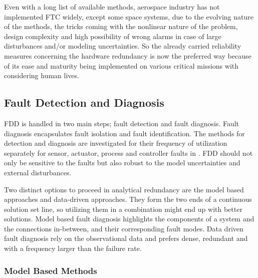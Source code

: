 Even with a long list of available methods, aerospace industry has not implemented 
FTC widely, except some space systems, due to the evolving nature of the methods, 
the tricks coming with the nonlinear nature of the problem, design complexity and high 
possibility of wrong alarms in case of large disturbances and/or modeling uncertainties. 
So the already carried reliability measures concerning the hardware redundancy is 
now the preferred way because of its ease and maturity being implemented on various 
critical missions with considering human lives.

\subsection{Fault Detection and Diagnosis}

FDD is handled in two main steps; fault detection and fault diagnosis. Fault diagnosis 
encapsulates fault isolation and fault identification. The methods for detection and 
diagnosis are investigated for their frequency of utilization separately for sensor, 
actuator, process and controller faults in \cite{isermann1997trends}. FDD should 
not only be sensitive to the faults but also robust to the model uncertainties and 
external disturbances.

Two distinct options to proceed in analytical redundancy are the model based 
approaches and data-driven approaches. They form the two ends of a continuous 
solution set line, so utilizing them in a combination might end up with better solutions. 
Model based fault diagnosis highlights the components of a system and the connections 
in-between, and their corresponding fault modes. Data driven fault diagnosis rely on 
the observational data and prefers dense, redundant and with a  frequency larger than 
the failure rate. 

%

\subsubsection{Model Based Methods}

